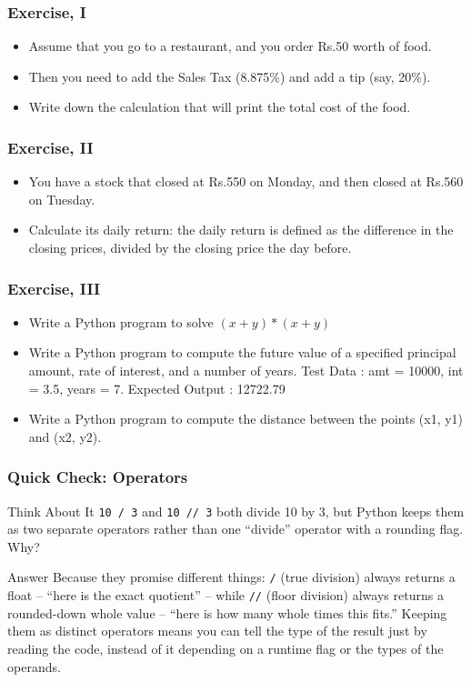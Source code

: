 \begin{frame}[fragile]\frametitle{Exercise, I}
\begin{itemize}
\item Assume that you go to a restaurant, and you order Rs.50 worth of food. 
\item Then you need to add the Sales Tax (8.875\%) and add a tip (say, 20\%). 
\item Write down the calculation that will print the total cost of the food.
\end{itemize}
\end{frame}
\begin{frame}[fragile]\frametitle{Exercise, II}
\begin{itemize}
\item You have a stock that closed at Rs.550 on Monday, and then closed at Rs.560 on Tuesday.
\item Calculate its daily return: the daily return is defined as the difference in the closing prices, divided by the closing price the day before.
\end{itemize}
\end{frame}

\begin{frame}[fragile]\frametitle{Exercise, III}
\begin{itemize}
\item Write a Python program to solve $(x + y) * (x + y)$
\item Write a Python program to compute the future value of a specified principal amount, rate of interest, and a number of years.  Test Data : amt = 10000, int = 3.5, years = 7.
Expected Output : 12722.79
\item Write a Python program to compute the distance between the points (x1, y1) and (x2, y2).
\end{itemize}
\end{frame}

\begin{frame}[fragile]\frametitle{Quick Check: Operators}
\begin{block}{Think About It}
\texttt{10 / 3} and \texttt{10 // 3} both divide 10 by 3, but Python keeps them as two separate operators rather than one ``divide'' operator with a rounding flag. Why?
\end{block}
\pause
\begin{block}{Answer}
Because they promise different things: \texttt{/} (true division) always returns a float -- ``here is the exact quotient'' -- while \texttt{//} (floor division) always returns a rounded-down whole value -- ``here is how many whole times this fits.'' Keeping them as distinct operators means you can tell the type of the result just by reading the code, instead of it depending on a runtime flag or the types of the operands.
\end{block}
\end{frame}
